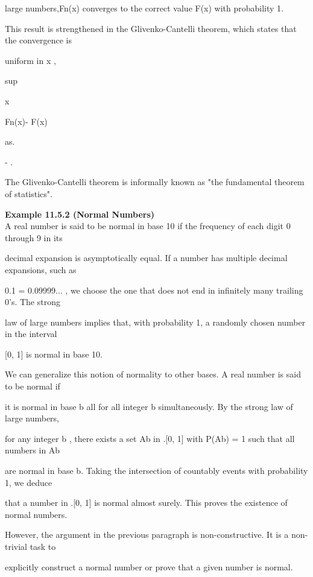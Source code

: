 large numbers,Fn(x) converges to the correct value F(x) with probability 1.

This result is strengthened in the Glivenko-Cantelli theorem, which states that the convergence is

uniform in x ,

sup

x\inR

\vert Fn(x)- F(x) \vert

as.

- .

The Glivenko-Cantelli theorem is informally known as "the fundamental theorem of statistics".

\textbf{Example 11.5.2 (Normal Numbers)} \\

A real number is said to be normal in base 10 if the frequency of each digit 0 through 9 in its

decimal expansion is asymptotically equal. If a number has multiple decimal expansions, such as

0.1 = 0.09999... , we choose the one that does not end in infinitely many trailing 0's. The strong

law of large numbers implies that, with probability 1, a randomly chosen number in the interval

[0, 1] is normal in base 10.

We can generalize this notion of normality to other bases. A real number is said to be normal if

it is normal in base b all for all integer b  simultaneously. By the strong law of large numbers,

for any integer b , there exists a set Ab in .[0, 1] with P(Ab) = 1 such that all numbers in Ab

are normal in base b. Taking the intersection of countably events with probability 1, we deduce

that a number in .[0, 1] is normal almost surely. This proves the existence of normal numbers.

However, the argument in the previous paragraph is non-constructive. It is a non-trivial task to

explicitly construct a normal number or prove that a given number is normal.
